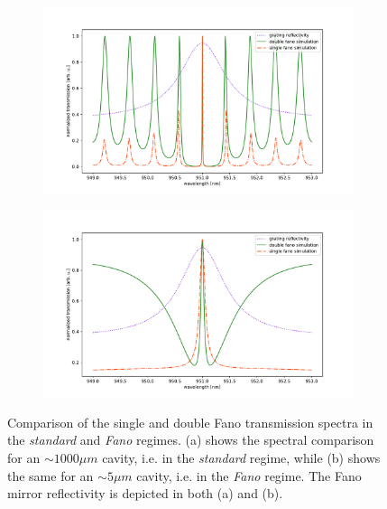 \begin{figure}[h!]
    \centering
    \begin{subfigure}[c]{0.49\textwidth}
        \centering
        \includegraphics[width=\textwidth]{figures/single_and_double_1000um.pdf}
        \caption{}
        \label{fig:double_in_standard_regime}
    \end{subfigure}
    \begin{subfigure}[c]{0.49\textwidth}
        \includegraphics[width=\textwidth]{figures/single_and_double_5um.pdf}
        \caption{}
        \label{fig:double_in_fano_regime}
    \end{subfigure}
    \caption{Comparison of the single and double Fano transmission spectra in the \emph{standard} and \emph{Fano} regimes. (a) shows the spectral comparison for an $\sim 1000 \mu m$ cavity, i.e. in the \emph{standard} regime, while (b) shows the same for an $\sim 5 \mu m$ cavity, i.e. in the \emph{Fano} regime. The Fano mirror reflectivity is depicted in both (a) and (b).}
    \label{fig:double_in_standard_and_fano_regimes}
\end{figure}

